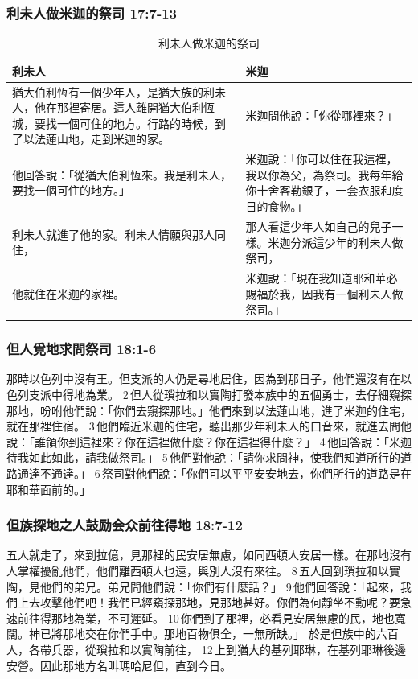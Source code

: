 \subsubsection{利未人做米迦的祭司 17:7-13}
\begin{table}[H]
\centering
\begin{tabular}{p{9cm}|p{8.1cm}}\hline
利未人&米迦\\\hline
猶大伯利恆有一個少年人，是猶大族的利未人，他在那裡寄居。這人離開猶大伯利恆城，要找一個可住的地方。行路的時候，到了以法蓮山地，走到米迦的家。&米迦問他說：「你從哪裡來？」 \\\hline
他回答說：「從猶大伯利恆來。我是利未人，要找一個可住的地方。」&米迦說：「你可以住在我這裡，我以你為父，為祭司。我每年給你十舍客勒銀子，一套衣服和度日的食物。」\\\hline
利未人就進了他的家。利未人情願與那人同住，&那人看這少年人如自己的兒子一樣。米迦分派這少年的利未人做祭司， \\\hline
他就住在米迦的家裡。
&米迦說：「現在我知道耶和華必賜福於我，因我有一個利未人做祭司。」\\\hline
\end{tabular}
\caption{利未人做米迦的祭司}
\end{table}  


\subsubsection{但人覓地求問祭司 18:1-6}
那時以色列中沒有王。但支派的人仍是尋地居住，因為到那日子，他們還沒有在以色列支派中得地為業。 2 但人從瑣拉和以實陶打發本族中的五個勇士，去仔細窺探那地，吩咐他們說：「你們去窺探那地。」他們來到以法蓮山地，進了米迦的住宅，就在那裡住宿。 3 他們臨近米迦的住宅，聽出那少年利未人的口音來，就進去問他說：「誰領你到這裡來？你在這裡做什麼？你在這裡得什麼？」 4 他回答說：「米迦待我如此如此，請我做祭司。」 5 他們對他說：「請你求問神，使我們知道所行的道路通達不通達。」 6 祭司對他們說：「你們可以平平安安地去，你們所行的道路是在耶和華面前的。」

\subsubsection{但族探地之人鼓励会众前往得地 18:7-12}
五人就走了，來到拉億，見那裡的民安居無慮，如同西頓人安居一樣。在那地沒有人掌權擾亂他們，他們離西頓人也遠，與別人沒有來往。 8 五人回到瑣拉和以實陶，見他們的弟兄。弟兄問他們說：「你們有什麼話？」 9 他們回答說：「起來，我們上去攻擊他們吧！我們已經窺探那地，見那地甚好。你們為何靜坐不動呢？要急速前往得那地為業，不可遲延。 10 你們到了那裡，必看見安居無慮的民，地也寬闊。神已將那地交在你們手中。那地百物俱全，一無所缺。」
於是但族中的六百人，各帶兵器，從瑣拉和以實陶前往， 12 上到猶大的基列耶琳，在基列耶琳後邊安營。因此那地方名叫瑪哈尼但，直到今日。

